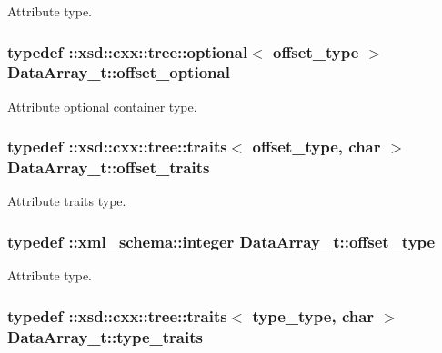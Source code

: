 Attribute type. 

\hypertarget{classDataArray__t_a4bc33060e7c386b658c752347ac5f03e}{
\subsubsection[{offset\-\_\-optional}]{\setlength{\rightskip}{0pt plus 5cm}typedef \-::xsd\-::cxx\-::tree\-::optional$<$ {\bf offset\-\_\-type} $>$ {\bf Data\-Array\-\_\-t\-::offset\-\_\-optional}}}\label{classDataArray__t_a4bc33060e7c386b658c752347ac5f03e}


Attribute optional container type. 

\hypertarget{classDataArray__t_a2e3e1a5de665fc64a3d86fd94bb1af0f}{
\subsubsection[{offset\-\_\-traits}]{\setlength{\rightskip}{0pt plus 5cm}typedef \-::xsd\-::cxx\-::tree\-::traits$<$ {\bf offset\-\_\-type}, char $>$ {\bf Data\-Array\-\_\-t\-::offset\-\_\-traits}}}\label{classDataArray__t_a2e3e1a5de665fc64a3d86fd94bb1af0f}


Attribute traits type. 

\hypertarget{classDataArray__t_a7b840c5f08bd2c65cd3c5e24ad132cfb}{
\subsubsection[{offset\-\_\-type}]{\setlength{\rightskip}{0pt plus 5cm}typedef \-::{\bf xml\-\_\-schema\-::integer} {\bf Data\-Array\-\_\-t\-::offset\-\_\-type}}}\label{classDataArray__t_a7b840c5f08bd2c65cd3c5e24ad132cfb}


Attribute type. 

\hypertarget{classDataArray__t_af1dc5f097a8645ae42b57eb3a0b10fa2}{
\subsubsection[{type\-\_\-traits}]{\setlength{\rightskip}{0pt plus 5cm}typedef \-::xsd\-::cxx\-::tree\-::traits$<$ {\bf type\-\_\-type}, char $>$ {\bf Data\-Array\-\_\-t\-::type\-\_\-traits}}}\label{classDataArray__t_af1dc5f097a8645ae42b57eb3a0b10fa2}



